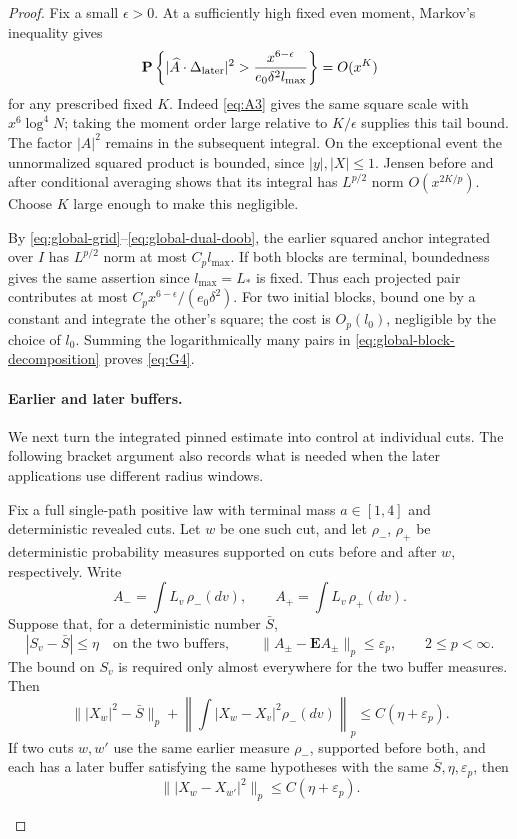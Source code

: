 \begin{proof}
Fix a small \(\epsilon>0\). At a sufficiently high fixed even
moment, Markov's inequality gives
\[
 \mathbf P\left\{
 |\widehat A\cdot\Delta_{\rm later}|^2
       >\frac{x^{6-\epsilon}}{e_0\delta^2l_{\max}}\right\}
       =O(x^K)
\]
for any prescribed fixed \(K\). Indeed \eqref{eq:A3} gives the
same square scale with \(x^6\log^4N\); taking the moment order
large relative to \(K/\epsilon\) supplies this tail bound. The
factor \(|A|^2\) remains in the subsequent integral. On the
exceptional event the unnormalized squared product is bounded,
since \(|y|,|X|\le1\). Jensen before and after conditional averaging
shows that its integral has \(L^{p/2}\) norm \(O(x^{2K/p})\).
Choose \(K\) large enough to make this negligible.

By \eqref{eq:global-grid}--\eqref{eq:global-dual-doob}, the earlier
squared anchor integrated over \(I\) has \(L^{p/2}\) norm at most
\(C_p l_{\max}\). If both blocks are terminal, boundedness gives
the same assertion since \(l_{\max}=L_*\) is fixed. Thus each
projected pair contributes at most
\(C_p x^{6-\epsilon}/(e_0\delta^2)\). For two initial blocks,
bound one by a constant and integrate the other's square; the cost
is \(O_p(l_0)\), negligible by the choice of \(l_0\).
Summing the logarithmically many pairs in
\eqref{eq:global-block-decomposition} proves \eqref{eq:G4}.

\paragraph{Earlier and later buffers.}\label{par:global-brackets}
We next turn the integrated pinned estimate into control at individual
cuts. The following bracket argument also records what is needed when
the later applications use different radius windows.

\begin{lemma}
\label{global:buffer-brackets}
Fix a full single-path positive law with terminal mass \(a\in[1,4]\)
and deterministic revealed cuts. Let \(w\) be one such cut, and let
\(\rho_-\), \(\rho_+\) be deterministic probability measures supported
on cuts before and after \(w\), respectively. Write
\[
 A_-=\int L_v\,\rho_-(dv),\qquad
 A_+=\int L_v\,\rho_+(dv).
\]
Suppose that, for a deterministic number \(\bar S\),
\[
 |S_v-\bar S|\le\eta\quad
  \text{on the two buffers},\qquad
 \|A_\pm-\mathbf EA_\pm\|_p\le\varepsilon_p,
 \qquad 2\le p<\infty.
\]
The bound on \(S_v\) is required only almost everywhere for the two
buffer measures. Then
\[
 \bigl\||X_w|^2-\bar S\bigr\|_p+
 \left\|\int|X_w-X_v|^2\rho_-(dv)\right\|_p
       \le C(\eta+\varepsilon_p).
\]
If two cuts \(w,w'\) use the same earlier measure \(\rho_-\), supported
before both, and each has a later buffer satisfying the same hypotheses
with the same \(\bar S,\eta,\varepsilon_p\), then
\[
 \bigl\||X_w-X_{w'}|^2\bigr\|_p\le C(\eta+\varepsilon_p).
\]
\end{lemma}


\end{proof}
